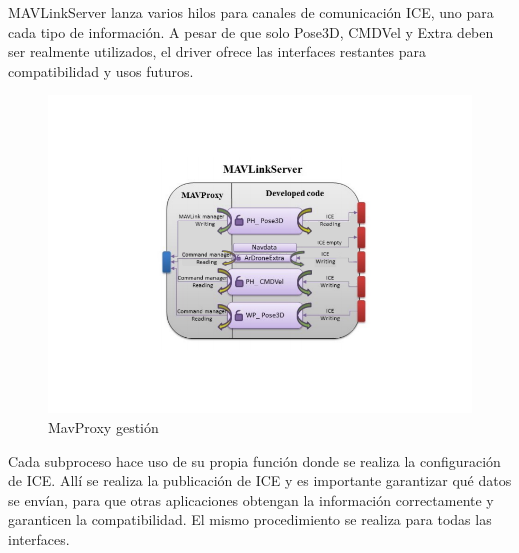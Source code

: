 \clearpage
MAVLinkServer lanza varios hilos para canales de comunicación ICE, uno para cada tipo de información. A pesar de que solo Pose3D, CMDVel y Extra deben ser realmente utilizados, el driver ofrece las interfaces restantes para compatibilidad y usos futuros.

\begin{figure}[H]
  \centering
  \includegraphics[scale=0.7]{imagenes/MavProxyPorDentro.png}
  \caption{MavProxy gestión}
  \label{fig:MavProxyInside}
\end{figure}

Cada subproceso hace uso de su propia función donde se realiza la configuración de ICE.
Allí se realiza la publicación de ICE y es importante garantizar qué datos se envían, para que otras aplicaciones obtengan la información correctamente y garanticen la compatibilidad.
El mismo procedimiento se realiza para todas las interfaces.

